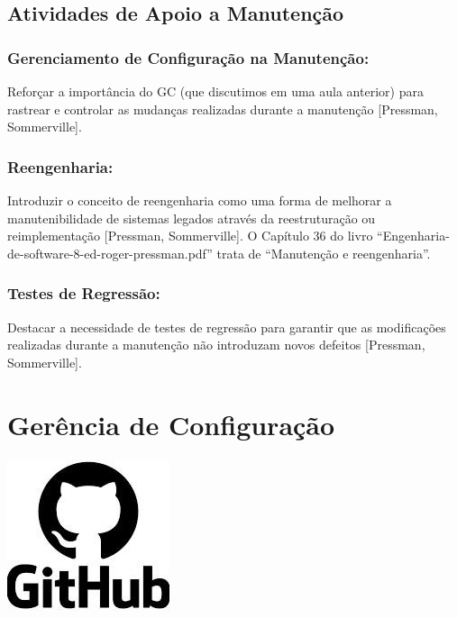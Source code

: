 \documentclass[
]{book}
\begin{document}
\section{Atividades de Apoio a Manutenção}\label{atividades-de-apoio-a-manutenuxe7uxe3o}

\subsection{Gerenciamento de Configuração na Manutenção:}\label{gerenciamento-de-configurauxe7uxe3o-na-manutenuxe7uxe3o}

Reforçar a importância do GC (que discutimos em uma aula anterior) para rastrear e controlar as mudanças realizadas durante a manutenção {[}Pressman, Sommerville{]}.

\subsection{Reengenharia:}\label{reengenharia}

Introduzir o conceito de reengenharia como uma forma de melhorar a manutenibilidade de sistemas legados através da reestruturação ou reimplementação {[}Pressman, Sommerville{]}. O Capítulo 36 do livro ``Engenharia-de-software-8-ed-roger-pressman.pdf'' trata de ``Manutenção e reengenharia''.

\subsection{Testes de Regressão:}\label{testes-de-regressuxe3o}

Destacar a necessidade de testes de regressão para garantir que as modificações realizadas durante a manutenção não introduzam novos defeitos {[}Pressman, Sommerville{]}.

\chapter{Gerência de Configuração}\label{geruxeancia-de-configurauxe7uxe3o}

\includegraphics{images/processos/manutencao/github-icone.jpg}
\end{document}
